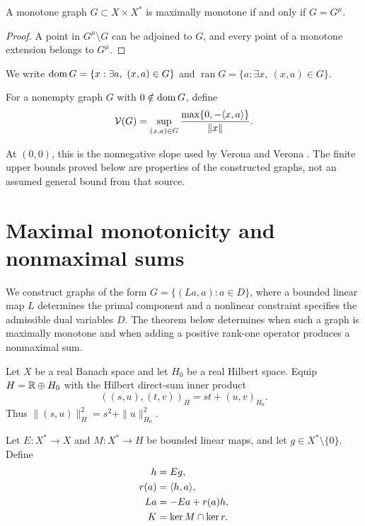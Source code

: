 \begin{proposition}
A monotone graph $G\subset X\times X^*$ is maximally monotone
if and only if $G=G^\mu$.
\end{proposition}
\begin{proof}
A point in $G^\mu\setminus G$ can be adjoined to $G$, and every
point of a monotone extension belongs to $G^\mu$.
\end{proof}

We write
$\operatorname{dom} G=\{x:\exists a,\ (x,a)\in G\}$ and
$\operatorname{ran}G=\{a:\exists x,\ (x,a)\in G\}$.


\begin{definition}
For a nonempty graph $G$ with $0\notin\operatorname{dom} G$, define
\begin{equation}
\mathcal V(G)=\sup_{(x,a)\in G}
 \frac{\max\{0,-\langle x,a\rangle\}}{\|x\|}.
\label{eq:D3}
\end{equation}
\end{definition}
At $(0,0)$, this is the nonnegative slope used by Verona and Verona
\cite{verona2008}. The finite upper bounds proved below are properties
of the constructed graphs, not an assumed general bound from that source.

\section{Maximal monotonicity and nonmaximal sums}
\label{sec:endpoint-criterion}
We construct graphs of the form $G=\{(La,a):a\in D\}$, where a bounded
linear map $L$ determines the primal component and a nonlinear constraint
specifies the admissible dual variables $D$. The theorem below determines
when such a graph is maximally monotone and when adding a positive
rank-one operator produces a nonmaximal sum.

Let $X$ be a real Banach space and let $H_0$ be a real Hilbert space.
Equip $H=\mathbb R\oplus H_0$ with the Hilbert direct-sum inner product
\[
((s,u),(t,v))_H=st+(u,v)_{H_0}.
\]
Thus $\|(s,u)\|_H^2=s^2+\|u\|_{H_0}^2$.

\begin{definition}
\label{def:construction-maps}
Let $E:X^*\to X$ and $M:X^*\to H$ be bounded linear maps, and let
$g\in X^*\setminus\{0\}$. Define
\[
\begin{aligned}
h&=Eg,\\
r(a)&=\langle h,a\rangle,\\
La&=-Ea+r(a)h,\\
K&=\ker M\cap\ker r.
\end{aligned}
\]
\end{definition}

